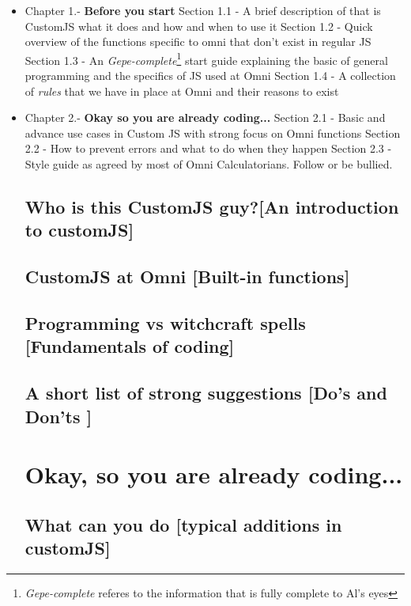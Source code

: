 \documentclass[11pt,a4paper,oldfontcommands]{memoir}
\begin{document}
\begin{itemize}
    \item Chapter 1.- \textbf{Before you start} 
        \subitem Section 1.1 - A brief description of that is CustomJS what it does and how and when to use it
        \subitem Section 1.2 - Quick overview of the functions specific to omni that don't exist in regular JS
\subitem Section 1.3 - An \textit{Gepe-complete}\footnote{\textit{Gepe-complete} referes to the information that is fully complete to Al's eyes} start guide explaining the basic of general programming and the specifics of JS used at Omni
        \subitem Section 1.4 - A collection of \textit{rules} that we have in place at Omni and their reasons to exist
    \item Chapter 2.- \textbf{Okay so you are already coding...}
        \subitem Section 2.1 - Basic and advance use cases in Custom JS with strong focus on Omni functions
        \subitem Section 2.2 - How to prevent errors and what to do when they happen
        \subitem Section 2.3 - Style guide as agreed by most of Omni Calculatorians. Follow or be bullied.

\section{Who is this CustomJS guy?\small[An introduction to customJS]}


\section{CustomJS at Omni \small{[Built-in functions]}}


\section{Programming vs witchcraft spells \small[Fundamentals of coding]}


\section{A short list of strong suggestions \small{[Do's and Don'ts ]}}


\chapter{Okay, so you are already coding...}

\section{What can you do \small{[typical additions in customJS]}}



\end{itemize}
\end{document}
